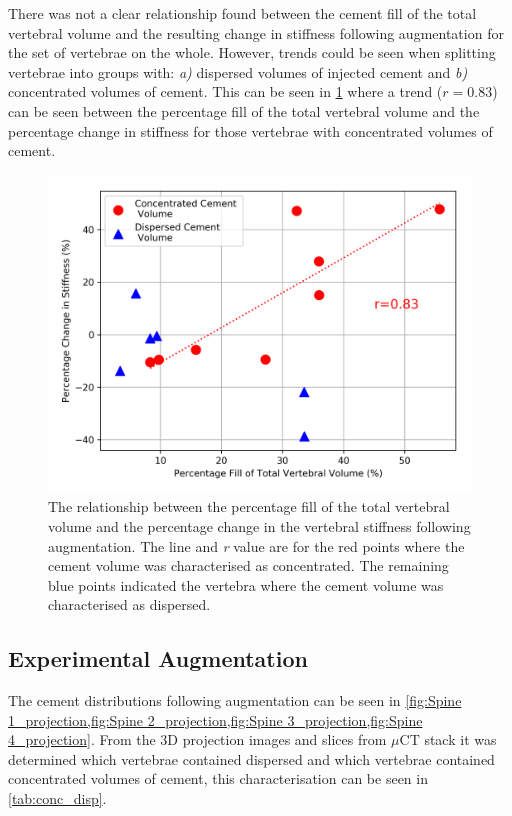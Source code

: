 There was not a clear relationship found between the cement fill of the total vertebral volume and the resulting change in stiffness following augmentation for the set of vertebrae on the whole.
However, trends could be seen when splitting vertebrae into groups with: \textit{a)} dispersed volumes of injected cement and \textit{b)} concentrated volumes of cement.
This can be seen in \cref{fig:aug_cmt_fill_vs_ch_stiff} where a trend ($r=0.83$) can be seen between the percentage fill of the total vertebral volume and the percentage change in stiffness for those vertebrae with concentrated volumes of cement.

\begin{figure}[h!]
  \centering
  \includegraphics[width=.7\textwidth]{Chapters/Chapter_HT_images/Aug_cmt_fill_vs_ch_stiff.png}
	\caption{The relationship between the percentage fill of the total vertebral volume and the percentage change in the vertebral stiffness following augmentation. The line and \textit{r} value are for the red points where the cement volume was characterised as concentrated. The remaining blue points indicated the vertebra where the cement volume was characterised as dispersed.}
  \label{fig:aug_cmt_fill_vs_ch_stiff}
\end{figure}

\subsection{Experimental Augmentation}

The cement distributions following augmentation can be seen in \cref{fig:Spine 1_projection,fig:Spine 2_projection,fig:Spine 3_projection,fig:Spine 4_projection}.
From the 3D projection images and slices from $\mu$CT stack it was determined which vertebrae contained dispersed and which vertebrae contained concentrated volumes of cement, this characterisation can be seen in \cref{tab:conc_disp}.




